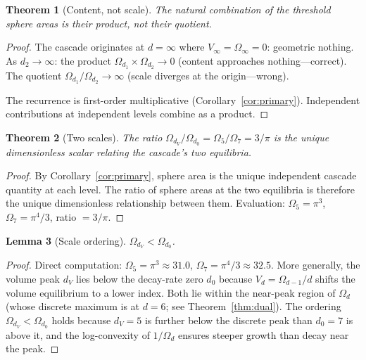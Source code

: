 \documentclass[11pt,a4paper]{article}
\newtheorem{theorem}{Theorem}[section]
\newtheorem{lemma}[theorem]{Lemma}
\begin{document}
\begin{theorem}[Content, not scale]\label{thm:content}
The natural combination of the threshold sphere areas is their product,
not their quotient.
\end{theorem}

\begin{proof}
The cascade originates at $d = \infty$ where
$V_\infty = \Omega_\infty = 0$: geometric nothing. As
$d_2\to\infty$: the product $\Omega_{d_1}\times\Omega_{d_2}\to 0$
(content approaches nothing---correct). The quotient
$\Omega_{d_1}/\Omega_{d_2}\to\infty$ (scale diverges at the origin---wrong).

The recurrence is first-order multiplicative
(Corollary~\ref{cor:primary}). Independent contributions at independent
levels combine as a product.
\end{proof}

\begin{theorem}[Two scales]\label{thm:twoscales}
The ratio $\Omega_{d_V}/\Omega_{d_0} = \Omega_5/\Omega_7 = 3/\pi$ is the
unique dimensionless scalar relating the cascade's two equilibria.
\end{theorem}

\begin{proof}
By Corollary~\ref{cor:primary}, sphere area is the unique independent
cascade quantity at each level. The ratio of sphere areas at the two
equilibria is therefore the unique dimensionless relationship between them.
Evaluation:
$\Omega_5 = \pi^3$,\;
$\Omega_7 = \pi^4/3$,\;
ratio $= 3/\pi$.
\end{proof}

\begin{lemma}[Scale ordering]\label{lem:ordering}
$\Omega_{d_V} < \Omega_{d_0}$.
\end{lemma}

\begin{proof}
Direct computation: $\Omega_5 = \pi^3\approx 31.0$,\;
$\Omega_7 = \pi^4/3\approx 32.5$.
More generally, the volume peak $d_V$ lies below the decay-rate zero
$d_0$ because $V_d = \Omega_{d-1}/d$ shifts the volume equilibrium to a
lower index. Both lie within the near-peak region of $\Omega_d$
(whose discrete maximum is at $d = 6$; see Theorem~\ref{thm:dual}).
The ordering $\Omega_{d_V} < \Omega_{d_0}$ holds because $d_V = 5$
is further below the discrete peak than $d_0 = 7$ is above it, and
the log-convexity of $1/\Omega_d$ ensures steeper growth than decay
near the peak.
\end{proof}
\end{document}
